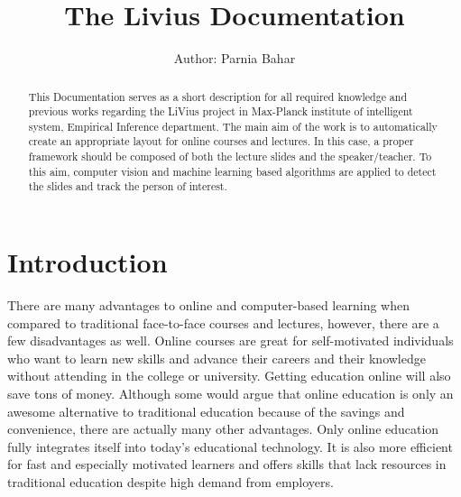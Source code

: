 \documentclass[[12pt,DIV14,BCOR12mm,a4paper,footexclude,headinclude,halfparskip-,twoside,openright,cleardoubleempty,idxtotoc,bibtotoc]{article}
\begin{document}
\title{The Livius Documentation}
\author{Author: Parnia Bahar}

\maketitle

\begin{abstract}
This Documentation serves as a short description for all required knowledge and previous works regarding the LiVius project in Max-Planck institute of intelligent system, Empirical Inference department. The main aim of the work is to automatically create an appropriate layout for online courses and lectures.  In this case, a proper framework should be composed of both the lecture slides and the speaker/teacher. To this aim, computer vision and machine learning  based algorithms are applied to detect the slides and track the person of interest.
\end{abstract}

\section{Introduction}

There are many advantages to online and computer-based learning when compared to traditional face-to-face courses and lectures, however, there are a few disadvantages as well.
Online courses are great for self-motivated individuals who want to learn new skills and advance their careers and their knowledge without attending in the college or university. Getting education online will also save tons of money. Although some would argue that online education is only an awesome alternative to traditional education because of the savings and convenience, there are actually many other advantages. Only online education fully integrates itself into today’s educational technology. It is also more efficient for fast and especially motivated learners and offers skills that lack resources in traditional education despite high demand from employers. 
\end{document}
